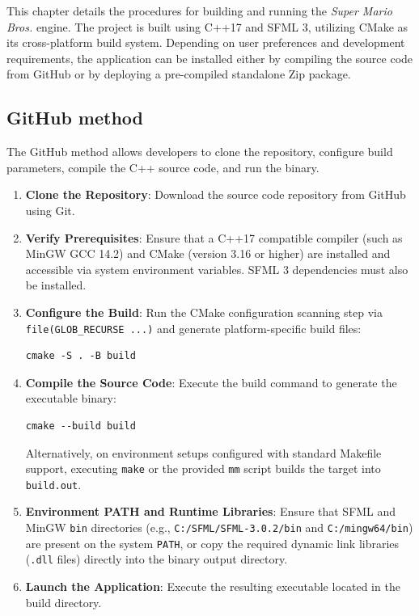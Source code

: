 \documentclass[12pt, a4paper]{article}
\begin{document}
This chapter details the procedures for building and running the \textit{Super Mario Bros.} engine. The project is built using C++17 and SFML 3, utilizing CMake as its cross-platform build system. Depending on user preferences and development requirements, the application can be installed either by compiling the source code from GitHub or by deploying a pre-compiled standalone Zip package.

\subsection{GitHub method}

The GitHub method allows developers to clone the repository, configure build parameters, compile the C++ source code, and run the binary.

\begin{enumerate}
\item \textbf{Clone the Repository}: Download the source code repository from GitHub using Git.

\item \textbf{Verify Prerequisites}: Ensure that a C++17 compatible compiler (such as MinGW GCC 14.2) and CMake (version 3.16 or higher) are installed and accessible via system environment variables. SFML 3 dependencies must also be installed.

\item \textbf{Configure the Build}: Run the CMake configuration scanning step via \texttt{file(GLOB\_RECURSE ...)} and generate platform-specific build files:

\begin{verbatim}
cmake -S . -B build
\end{verbatim}

\item \textbf{Compile the Source Code}: Execute the build command to generate the executable binary:

\begin{verbatim}
cmake --build build
\end{verbatim}

Alternatively, on environment setups configured with standard Makefile support, executing \texttt{make} or the provided \texttt{mm} script builds the target into \texttt{build.out}.

\item \textbf{Environment PATH and Runtime Libraries}: Ensure that SFML and MinGW \texttt{bin} directories (e.g., \texttt{C:/SFML/SFML-3.0.2/bin} and \texttt{C:/mingw64/bin}) are present on the system \texttt{PATH}, or copy the required dynamic link libraries (\texttt{.dll} files) directly into the binary output directory.

\item \textbf{Launch the Application}: Execute the resulting executable located in the build directory.

\end{enumerate}
\end{document}

